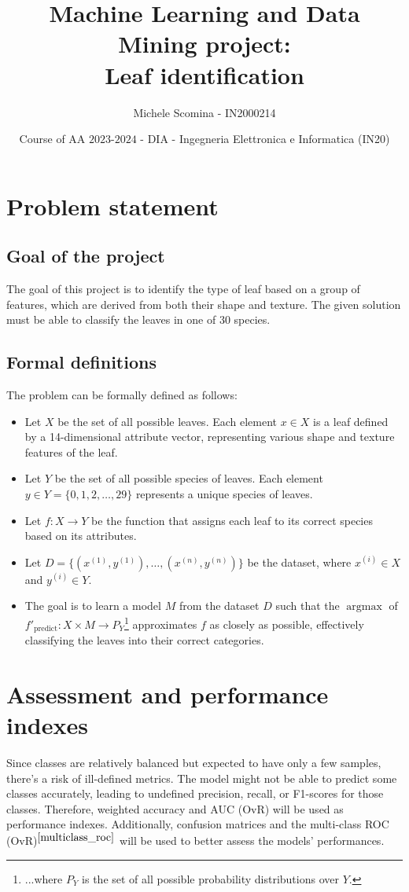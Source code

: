 \documentclass{article}
\title{Machine Learning and Data Mining project:\\Leaf identification}
\author[1]{Michele Scomina - IN2000214}
\date{Course of AA $2023$-$2024$ - DIA - Ingegneria Elettronica e Informatica (IN20)}
\begin{document}
\maketitle



\section{Problem statement}
\subsection{Goal of the project}
The goal of this project is to identify the type of leaf based on a group of features, which are derived from both their shape and texture.
The given solution must be able to classify the leaves in one of 30 species.

\subsection{Formal definitions}
The problem can be formally defined as follows:
\begin{itemize}
    \item Let $X$ be the set of all possible leaves. Each element $x \in X$ is a leaf defined by a 14-dimensional attribute vector, representing various shape and texture features of the leaf.
    \item Let $Y$ be the set of all possible species of leaves. Each element $y \in Y = \{0, 1, 2, \ldots, 29\}$ represents a unique species of leaves.
    \item Let $f: X \to Y$ be the function that assigns each leaf to its correct species based on its attributes.
    \item Let $D = \{(x^{(1)}, y^{(1)}), \ldots, (x^{(n)}, y^{(n)})\}$ be the dataset, where $x^{(i)} \in X$ and $y^{(i)} \in Y$.
    \item The goal is to learn a model $M$ from the dataset $D$ such that the $\operatorname{argmax}$ of $f'_{\text{predict}}: X \times M \to P_{Y}$\footnote{...where $P_{Y}$ is the set of all possible probability distributions over $Y$.} approximates $f$ as closely as possible, effectively classifying the leaves into their correct categories.
\end{itemize}


\section{Assessment and performance indexes}
Since classes are relatively balanced but expected to have only a few samples, there's a risk of ill-defined metrics. 
The model might not be able to predict some classes accurately, leading to undefined precision, recall, or F1-scores for those classes.
Therefore, weighted accuracy and AUC (OvR) will be used as performance indexes.
Additionally, confusion matrices and the multi-class ROC (OvR)$^{\cite{multiclass_roc}}$ will be used to better assess the models' performances.
\end{document}

